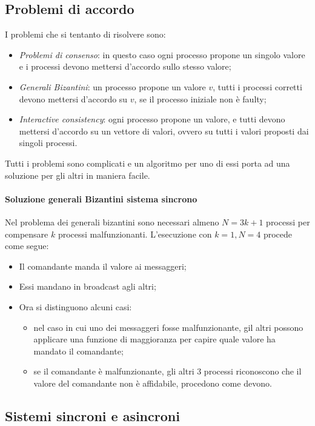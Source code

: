 \subsection{Problemi di accordo}
I problemi che si tentanto di risolvere sono:
\begin{itemize}
    \item \emph{Problemi di consenso}: in questo caso ogni processo 
    propone un singolo valore e i processi devono mettersi d'accordo 
    sullo stesso valore;
    \item \emph{Generali Bizantini}: un processo propone un valore $v$, 
    tutti i processi corretti devono mettersi d'accordo su $v$, se 
    il processo iniziale non è faulty;
    \item \emph{Interactive consistency}: ogni processo propone un valore, 
    e tutti devono mettersi d'accordo su un vettore di valori, 
    ovvero su tutti i valori proposti dai singoli processi.
\end{itemize}

Tutti i problemi sono complicati e un algoritmo per uno di essi 
porta ad una soluzione per gli altri in maniera facile.

\paragraph{Soluzione generali Bizantini sistema sincrono}
Nel problema dei generali bizantini sono necessari almeno 
$N = 3k + 1$ processi per compensare $k$ processi malfunzionanti.
L'esecuzione con $k = 1, N = 4$ procede come segue: 
\begin{itemize}
    \item Il comandante manda il valore ai messaggeri;
    \item Essi mandano in broadcast agli altri;
    \item Ora si distinguono alcuni casi:
    \begin{itemize}
        \item nel caso in cui uno dei messaggeri fosse malfunzionante, 
        gil altri possono applicare una funzione di maggioranza 
        per capire quale valore ha mandato il comandante;
        \item se il comandante è malfunzionante, gli altri 3 processi 
        riconoscono che il valore del comandante non è affidabile, 
        procedono come devono.
    \end{itemize}
\end{itemize}

\subsection{Sistemi sincroni e asincroni}

